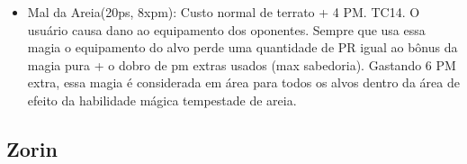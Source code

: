 \begin{itemize}
	\item Mal da Areia(20ps, 8xpm): Custo normal de terrato + 4 PM. TC14.\newline
O usuário causa dano ao equipamento dos oponentes. Sempre que usa essa magia o equipamento do alvo perde uma quantidade de PR igual ao bônus da magia pura + o dobro de pm extras usados (max sabedoria). Gastando 6 PM extra, essa magia é considerada em área para todos os alvos dentro da área de efeito da habilidade mágica tempestade de areia.



\end{itemize}


\subsection{Zorin}

